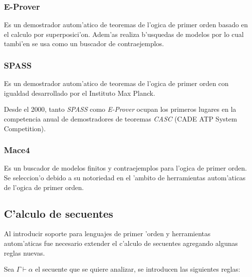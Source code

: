 \subsubsection{E-Prover}

Es un demostrador autom'atico de teoremas de l'ogica de primer orden basado en el calculo por superposici'on. Adem'as realiza b'usquedas de modelos por lo cual tambi'en se usa como un buscador de contraejemplos.

\subsubsection{SPASS}

Es un demostrador autom'atico de teoremas de l'ogica de primer orden con igualdad desarrollado por el Instituto Max Planck.

Desde el 2000, tanto \textit{SPASS} como \textit{E-Prover} ocupan los primeros lugares en la competencia anual de demostradores de teoremas \textit{CASC} (CADE ATP System Competition).

\subsubsection{Mace4}

Es un buscador de modelos finitos y contraejemplos para l'ogica de primer orden. Se seleccion'o debido a su notoriedad en el 'ambito de herramientas autom'aticas de l'ogica de primer orden.

\subsection{C'alculo de secuentes} 

Al introducir soporte para lenguajes de primer 'orden y herramientas autom'aticas fue necesario extender el c'alculo de secuentes agregando algunas reglas nuevas.

Sea $\Gamma \vdash \alpha$ el secuente que se quiere analizar, se introducen las siguientes reglas:


